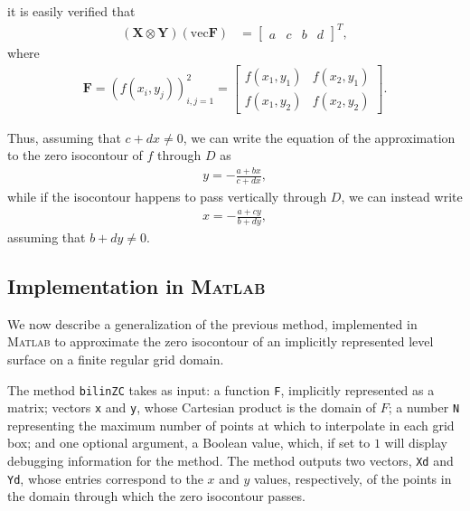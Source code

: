 \documentclass{article}
\begin{document}
it is easily verified that
\begin{align*}
  \left(\mathbf{X} \otimes \mathbf{Y}\right)\left(\mathrm{vec}\mathbf{F}\right)   %
  &= \left[
    \begin{array}{rrrr}
      a & c & b & d 
    \end{array}
  \right]^T,
\end{align*}
where 
\begin{align*}
  \mathbf{F} 
  = (f(x_i,y_j))_{i,j=1}^2 
  = \left[
    \begin{array}{rr}
      f(x_1, y_1) & f(x_2, y_1)\\
      f(x_1, y_2) & f(x_2, y_2)
    \end{array}
  \right].
\end{align*}

Thus, assuming that $c+dx \neq 0$, we can write the equation of
the approximation to the zero isocontour of $f$ through $D$ as
\begin{align*}
  y = - \frac{a + bx}{c+dx},
\end{align*}
while if the isocontour happens to pass vertically through $D$, we
can instead write
\begin{align*}
  x = - \frac{a+cy}{b+dy},
\end{align*}
assuming that $b+dy\neq 0$. 

\clearpage
\subsection{Implementation in \textsc{Matlab}}
\label{sec:impl-matl}

We now describe a generalization of the previous method,
implemented in \textsc{Matlab} to approximate the zero isocontour
of an implicitly represented level surface on a finite regular
grid domain. 



The method \texttt{bilinZC} takes as input: a function \texttt{F},
implicitly represented as a matrix; vectors \texttt{x} and
\texttt{y}, whose Cartesian product is the domain of $F$; a number
\texttt{N} representing the maximum number of points at which to
interpolate in each grid box; and one optional argument, a Boolean
value, which, if set to $1$ will display debugging information for
the method. The method outputs two vectors, \texttt{Xd} and
\texttt{Yd}, whose entries correspond to the $x$ and $y$ values,
respectively, of the points in the domain through which the zero
isocontour passes.
\end{document}

